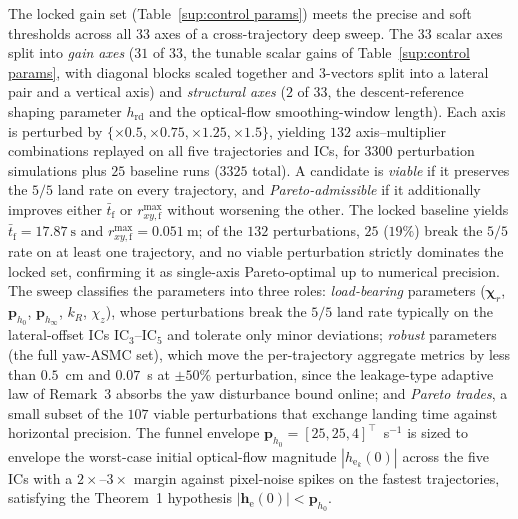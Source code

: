 \documentclass{IEEEtaes}
\begin{document}
The locked gain set (Table~\ref{sup:control params}) meets the precise and soft thresholds across all 33 axes of a cross-trajectory deep sweep. The $33$ scalar axes split into \emph{gain axes} ($31$ of $33$, the tunable scalar gains of Table~\ref{sup:control params}, with diagonal blocks scaled together and 3-vectors split into a lateral pair and a vertical axis) and \emph{structural axes} ($2$ of $33$, the descent-reference shaping parameter $h_\text{rd}$ and the optical-flow smoothing-window length). Each axis is perturbed by $\{\times 0.5,\times 0.75,\times 1.25,\times 1.5\}$, yielding $132$ axis--multiplier combinations replayed on all five trajectories and ICs, for $3300$ perturbation simulations plus $25$ baseline runs ($3325$ total). A candidate is \emph{viable} if it preserves the $5/5$ land rate on every trajectory, and \emph{Pareto-admissible} if it additionally improves either $\bar{t}_\text{f}$ or $r_{xy,\text{f}}^{\max}$ without worsening the other. The locked baseline yields $\bar{t}_\text{f}=17.87~\text{s}$ and $r_{xy,\text{f}}^{\max}=0.051~\text{m}$; of the $132$ perturbations, $25$ ($19\%$) break the $5/5$ rate on at least one trajectory, and no viable perturbation strictly dominates the locked set, confirming it as single-axis Pareto-optimal up to numerical precision. The sweep classifies the parameters into three roles: \emph{load-bearing} parameters ($\boldsymbol{\chi}_r$, $\boldsymbol{p}_{h_0}$, $\boldsymbol{p}_{h_\infty}$, $k_R$, $\chi_z$), whose perturbations break the $5/5$ land rate typically on the lateral-offset ICs IC$_3$--IC$_5$ and tolerate only minor deviations; \emph{robust} parameters (the full yaw-ASMC set), which move the per-trajectory aggregate metrics by less than $0.5$~cm and $0.07$~s at $\pm 50\%$ perturbation, since the leakage-type adaptive law of Remark~3 absorbs the yaw disturbance bound online; and \emph{Pareto trades}, a small subset of the $107$ viable perturbations that exchange landing time against horizontal precision. The funnel envelope $\boldsymbol{p}_{h_0}=[25,25,4]^\top$~s$^{-1}$ is sized to envelope the worst-case initial optical-flow magnitude $|h_{\text{e}_k}(0)|$ across the five ICs with a $2\times$--$3\times$ margin against pixel-noise spikes on the fastest trajectories, satisfying the Theorem~1 hypothesis $|\boldsymbol{h}_\text{e}(0)|<\boldsymbol{p}_{h_0}$.
\end{document}

